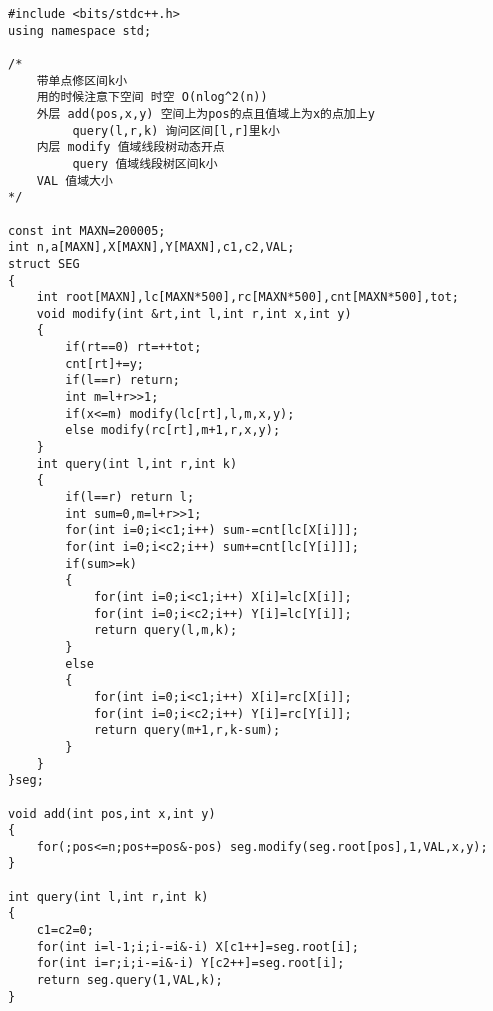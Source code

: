 \begin{lstlisting}
#include <bits/stdc++.h>
using namespace std;

/*
    带单点修区间k小
    用的时候注意下空间 时空 O(nlog^2(n))
    外层 add(pos,x,y) 空间上为pos的点且值域上为x的点加上y
         query(l,r,k) 询问区间[l,r]里k小
    内层 modify 值域线段树动态开点
         query 值域线段树区间k小
    VAL 值域大小
*/

const int MAXN=200005;
int n,a[MAXN],X[MAXN],Y[MAXN],c1,c2,VAL;
struct SEG
{
    int root[MAXN],lc[MAXN*500],rc[MAXN*500],cnt[MAXN*500],tot;
    void modify(int &rt,int l,int r,int x,int y)
    {
        if(rt==0) rt=++tot;
        cnt[rt]+=y;
        if(l==r) return;
        int m=l+r>>1;
        if(x<=m) modify(lc[rt],l,m,x,y);
        else modify(rc[rt],m+1,r,x,y);
    }
    int query(int l,int r,int k)
    {
        if(l==r) return l;
        int sum=0,m=l+r>>1;
        for(int i=0;i<c1;i++) sum-=cnt[lc[X[i]]];
        for(int i=0;i<c2;i++) sum+=cnt[lc[Y[i]]];
        if(sum>=k)
        {
            for(int i=0;i<c1;i++) X[i]=lc[X[i]];
            for(int i=0;i<c2;i++) Y[i]=lc[Y[i]];
            return query(l,m,k);
        }
        else
        {
            for(int i=0;i<c1;i++) X[i]=rc[X[i]];
            for(int i=0;i<c2;i++) Y[i]=rc[Y[i]];
            return query(m+1,r,k-sum);
        }
    }
}seg;

void add(int pos,int x,int y)
{
    for(;pos<=n;pos+=pos&-pos) seg.modify(seg.root[pos],1,VAL,x,y);
}

int query(int l,int r,int k)
{
    c1=c2=0;
    for(int i=l-1;i;i-=i&-i) X[c1++]=seg.root[i];
    for(int i=r;i;i-=i&-i) Y[c2++]=seg.root[i];
    return seg.query(1,VAL,k);
}
\end{lstlisting}